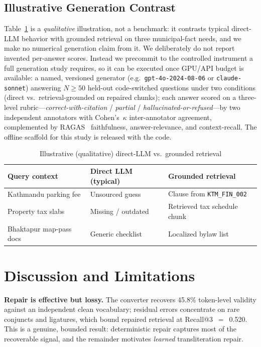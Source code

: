 \documentclass[journal]{IEEEtran}
\newcommand{\repRecall}{0.520}
\newcommand{\repairValidity}{45.8}
\begin{document}
\subsection{Illustrative Generation Contrast}
\label{sec:llm-vs-rag}
Table~\ref{tab:llm-vs-rag} is a \emph{qualitative} illustration, not a benchmark: it contrasts typical direct-LLM behavior with grounded retrieval on three municipal-fact needs, and we make no numerical generation claim from it. We deliberately do not report invented per-answer scores. Instead we precommit to the controlled instrument a full generation study requires, so it can be executed once GPU/API budget is available: a named, versioned generator (e.g.\ \texttt{gpt-4o-2024-08-06} or \texttt{claude-sonnet}) answering $N\!\ge\!50$ held-out code-switched questions under two conditions (direct vs.\ retrieval-grounded on repaired chunks); each answer scored on a three-level rubric---\emph{correct-with-citation} / \emph{partial} / \emph{hallucinated-or-refused}---by two independent annotators with Cohen's~$\kappa$ inter-annotator agreement, complemented by RAGAS~\cite{es2024ragas} faithfulness, answer-relevance, and context-recall. The offline scaffold for this study is released with the code.

\begin{table}[t]
\caption{Illustrative (qualitative) direct-LLM vs.\ grounded retrieval}
\label{tab:llm-vs-rag}
\centering
\footnotesize
\begin{tabular}{p{2.1cm}p{2.4cm}p{2.4cm}}
\toprule
\textbf{Query context} & \textbf{Direct LLM (typical)} & \textbf{Grounded retrieval} \\
\midrule
Kathmandu parking fee & Unsourced guess & Clause from \texttt{KTM\_FIN\_002} \\
Property tax slabs & Missing / outdated & Retrieved tax schedule chunk \\
Bhaktapur map-pass docs & Generic checklist & Localized bylaw list \\
\bottomrule
\end{tabular}
\end{table}

\section{Discussion and Limitations}
\textbf{Repair is effective but lossy.} The converter recovers \repairValidity{}\% token-level validity against an independent clean vocabulary; residual errors concentrate on rare conjuncts and ligatures, which bound repaired retrieval at Recall@3~$=$~\repRecall{}. This is a genuine, bounded result: deterministic repair captures most of the recoverable signal, and the remainder motivates \emph{learned} transliteration repair.
\end{document}
